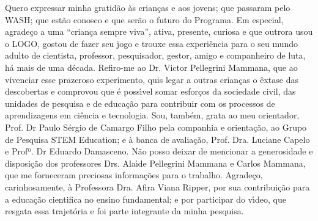 \begin{agradecimentos}
Quero expressar minha gratid\~ao \`as crian\c{c}as e aos jovens; que passaram pelo WASH; que est\~ao conosco e que ser\~ao o futuro do Programa.
Em especial, agrade\c{c}o a uma “crian\c{c}a sempre viva”, ativa, presente, curiosa e que outrora usou o LOGO, gostou de fazer seu jogo e trouxe essa experi\^encia para o seu mundo adulto de cientista, professor, pesquisador, gestor, amigo e companheiro de luta, h\'a mais de uma d\'ecada. Refiro-me ao Dr. Victor Pellegrini Mammana, que ao vivenciar esse prazeroso experimento, quis legar a outras crian\c{c}as o \^extase das descobertas e comprovou que \'e poss\'{\i}vel somar esfor\c{c}os da sociedade civil, das unidades de pesquisa e de educa\c{c}\~ao para contribuir com os processos de aprendizagens em ci\^encia e tecnologia.
Sou, tamb\'em, grata ao meu orientador, Prof. Dr Paulo S\'ergio de Camargo Filho pela companhia e orienta\c{c}\~ao, ao Grupo de Pesquisa STEM Education; e \`a banca de avalia\c{c}\~ao, Prof. Dra. Luciane Capelo e Profº. Dr Eduardo Damasceno.
N\~ao posso deixar de mencionar a generosidade e disposi\c{c}\~ao dos professores Drs. Ala\'{\i}de Pellegrini Mammana e Carlos Mammana, que me forneceram preciosas informa\c{c}\~oes para o trabalho.
Agrade\c{c}o, carinhosamente, \`a Professora Dra. Afira Viana Ripper, por sua contribui\c{c}\~ao para a educa\c{c}\~ao cientifica no ensino fundamental; e por participar do v\'{\i}deo, que resgata essa trajet\'oria e foi parte integrante da minha pesquisa.

\end{agradecimentos}
